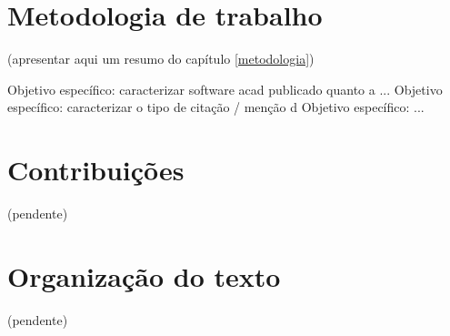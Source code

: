 \section{Metodologia de trabalho}

(apresentar aqui um resumo do capítulo \ref{metodologia})

Objetivo específico: caracterizar software acad publicado quanto a ...
Objetivo específico: caracterizar o tipo de citação / menção d
Objetivo específico: ...


\section{Contribuições}

(pendente)

\section{Organização do texto}

(pendente)

%
%
%
%


